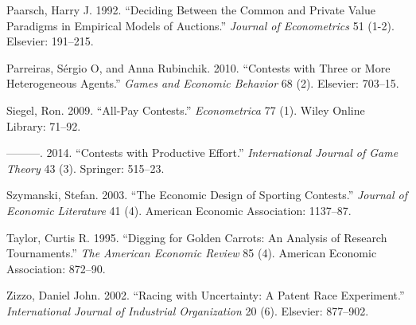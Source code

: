 \documentclass[10pt, titlepage]{article}
\begin{document}
\hypertarget{ref-paarsch1992deciding}{}
Paarsch, Harry J. 1992. ``Deciding Between the Common and Private Value
Paradigms in Empirical Models of Auctions.'' \emph{Journal of
Econometrics} 51 (1-2). Elsevier: 191--215.

\hypertarget{ref-parreiras2010contests}{}
Parreiras, Sérgio O, and Anna Rubinchik. 2010. ``Contests with Three or
More Heterogeneous Agents.'' \emph{Games and Economic Behavior} 68 (2).
Elsevier: 703--15.

\hypertarget{ref-siegel2009all}{}
Siegel, Ron. 2009. ``All-Pay Contests.'' \emph{Econometrica} 77 (1).
Wiley Online Library: 71--92.

\hypertarget{ref-siegel2014contests}{}
---------. 2014. ``Contests with Productive Effort.''
\emph{International Journal of Game Theory} 43 (3). Springer: 515--23.

\hypertarget{ref-szymanski2003economic}{}
Szymanski, Stefan. 2003. ``The Economic Design of Sporting Contests.''
\emph{Journal of Economic Literature} 41 (4). American Economic
Association: 1137--87.

\hypertarget{ref-taylor1995digging}{}
Taylor, Curtis R. 1995. ``Digging for Golden Carrots: An Analysis of
Research Tournaments.'' \emph{The American Economic Review} 85 (4).
American Economic Association: 872--90.

\hypertarget{ref-zizzo2002racing}{}
Zizzo, Daniel John. 2002. ``Racing with Uncertainty: A Patent Race
Experiment.'' \emph{International Journal of Industrial Organization} 20
(6). Elsevier: 877--902.
\end{document}
